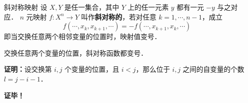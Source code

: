 

\begin{definition}{斜对称映射}
设 $X,Y$ 是任一集合，其中 $Y$ 上的任一元素 $y$ 都有一元 $-y$ 与之对应． $n$ 元映射 $f:X^n\rightarrow Y$ 叫作\textbf{斜对称的}，若对任意 $k=1,\cdots,n-1$，成立
\begin{equation}
f(\cdots,x_k,x_{k+1},\cdots)=-f(\cdots,x_{k+1},x_k,\cdots)
\end{equation}
即当交换任意两个相邻变量的位置时，映射值变号．
\end{definition}
\begin{theorem}{}
交换任意两个变量的位置，斜对称函数都变号．
\end{theorem}
\textbf{证明：}设交换第 $i,j$ 个变量的位置，且 $i<j$，那么位于 $i,j$ 之间的自变量的个数 $l=j-i-1$．

\textbf{证毕！}